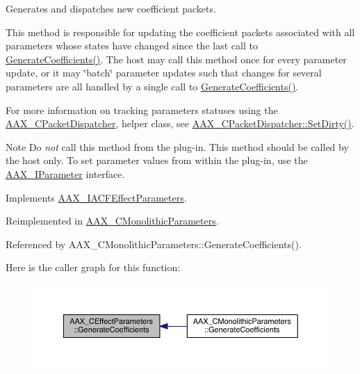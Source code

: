 Generates and dispatches new coefficient packets. 

This method is responsible for updating the coefficient packets associated with all parameters whose states have changed since the last call to \hyperlink{a00061_a083265b008921b6114ede387711694b7}{Generate\+Coefficients()}. The host may call this method once for every parameter update, or it may \char`\"{}batch\char`\"{} parameter updates such that changes for several parameters are all handled by a single call to \hyperlink{a00061_a083265b008921b6114ede387711694b7}{Generate\+Coefficients()}.

For more information on tracking parameters\textquotesingle{} statuses using the \hyperlink{a00031}{A\+A\+X\+\_\+\+C\+Packet\+Dispatcher}, helper class, see \hyperlink{a00031_a6d4254a842eeee46a227ec761619efb5}{A\+A\+X\+\_\+\+C\+Packet\+Dispatcher\+::\+Set\+Dirty()}.

\begin{DoxyNote}{Note}
Do {\itshape not} call this method from the plug-\/in. This method should be called by the host only. To set parameter values from within the plug-\/in, use the \hyperlink{a00108}{A\+A\+X\+\_\+\+I\+Parameter} interface. 
\end{DoxyNote}


Implements \hyperlink{a00061_a083265b008921b6114ede387711694b7}{A\+A\+X\+\_\+\+I\+A\+C\+F\+Effect\+Parameters}.



Reimplemented in \hyperlink{a00026_ac9a3a7ac90562135ceb4b80301e12e92}{A\+A\+X\+\_\+\+C\+Monolithic\+Parameters}.



Referenced by A\+A\+X\+\_\+\+C\+Monolithic\+Parameters\+::\+Generate\+Coefficients().



Here is the caller graph for this function\+:
\nopagebreak
\begin{figure}[H]
\begin{center}
\leavevmode
\includegraphics[width=350pt]{a00018_a7f85327b464a4a7f9b66155f37961bf3_icgraph}
\end{center}
\end{figure}


